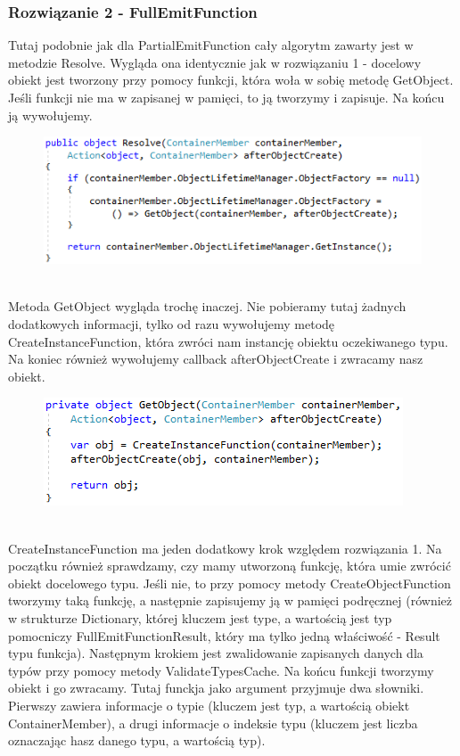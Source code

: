 \documentclass[12pt]{article}
\begin{document}
\subsubsection{Rozwiązanie 2 - FullEmitFunction}
Tutaj podobnie jak dla PartialEmitFunction cały algorytm zawarty jest w metodzie Resolve. Wygląda ona identycznie jak w rozwiązaniu 1 - docelowy obiekt jest tworzony przy pomocy funkcji, która woła w sobię metodę GetObject. Jeśli funkcji nie ma w zapisanej w pamięci, to ją tworzymy i zapisuje. Na końcu ją wywołujemy.
\begin{figure}[h]
	\begin{raggedleft}
  		\includegraphics{FullEmitFunction_Resolve.png}
	\end{raggedleft}
\end{figure}\\
Metoda GetObject wygląda trochę inaczej. Nie pobieramy tutaj żadnych dodatkowych informacji, tylko od razu wywołujemy metodę CreateInstanceFunction, która zwróci nam instancję obiektu oczekiwanego typu. Na koniec również wywołujemy callback afterObjectCreate i zwracamy nasz obiekt.
\begin{figure}[h]
	\begin{raggedleft}
  		\includegraphics{FullEmitFunction_GetObject.png}
	\end{raggedleft}
\end{figure}\\
CreateInstanceFunction ma jeden dodatkowy krok względem rozwiązania 1. Na początku również sprawdzamy, czy mamy utworzoną funkcję, która umie zwrócić obiekt docelowego typu. Jeśli nie, to przy pomocy metody CreateObjectFunction tworzymy taką funkcję, a następnie zapisujemy ją w pamięci podręcznej (również w strukturze Dictionary, której kluczem jest type, a wartością jest typ pomocniczy FullEmitFunctionResult, który ma tylko jedną właściwość - Result typu funkcja). Następnym krokiem jest zwalidowanie zapisanych danych dla typów przy pomocy metody ValidateTypesCache. Na końcu funkcji tworzymy obiekt  i go zwracamy. Tutaj funckja jako argument przyjmuje dwa słowniki. Pierwszy zawiera informacje o typie (kluczem jest typ, a wartością obiekt ContainerMember), a drugi informacje o indeksie typu (kluczem jest liczba oznaczając hasz danego typu, a wartością typ).\\
\end{document}
